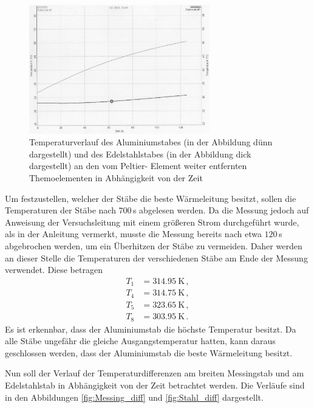 \begin{figure}
  \centering
  \includegraphics[width=0.7\textwidth]{data/t5undt8.JPEG}
  \caption{Temperaturverlauf des Aluminiumstabes (in der Abbildung dünn dargestellt)
  und des Edelstahlstabes (in der Abbildung dick dargestellt) an den vom Peltier-
  Element weiter entfernten Themoelementen in Abhängigkeit von der Zeit}
  \label{fig:T5_T8}
\end{figure}

Um festzustellen, welcher der Stäbe die beste Wärmeleitung besitzt, sollen die Temperaturen
der Stäbe nach $700$\,s abgelesen werden. Da die Messung jedoch auf Anweisung der Versuchsleitung
mit einem größeren Strom durchgeführt wurde, als in der Anleitung vermerkt, musste die Messung
bereits nach etwa $120$\,s abgebrochen werden, um ein Überhitzen der Stäbe zu vermeiden.
Daher werden an dieser Stelle die Temperaturen der verschiedenen Stäbe am Ende der
Messung verwendet. Diese betragen
\begin{align}
  T_1 &= \SI{314.95}{\kelvin}\,, \nonumber \\
  T_4 &= \SI{314.75}{\kelvin}\,,  \nonumber\\
  T_5 &= \SI{323.65}{\kelvin}\,,  \nonumber \\
  T_8 &= \SI{303.95}{\kelvin}\,.  \nonumber
\end{align}
Es ist erkennbar, dass der Aluminiumstab die höchste Temperatur besitzt. Da alle
Stäbe ungefähr die gleiche Ausgangstemperatur hatten, kann daraus geschlossen werden,
dass der Aluminiumstab die beste Wärmeleitung besitzt.

Nun soll der Verlauf der Temperaturdifferenzen am breiten Messingstab und am Edelstahlstab
in Abhängigkeit von der Zeit betrachtet werden. Die Verläufe sind in den Abbildungen
\ref{fig:Messing_diff} und \ref{fig:Stahl_diff} dargestellt.


